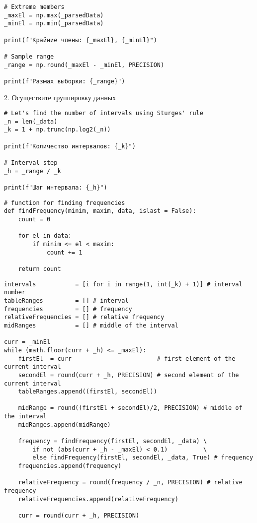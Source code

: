 \documentclass[a4paper, 14pt]{extarticle}
\begin{document}
\begin{lstlisting}
# Extreme members
_maxEl = np.max(_parsedData)
_minEl = np.min(_parsedData)

print(f"Крайние члены: {_maxEl}, {_minEl}")

# Sample range
_range = np.round(_maxEl - _minEl, PRECISION)

print(f"Размах выборки: {_range}")
\end{lstlisting}

\begin{center}
    2. Осуществите группировку данных
\end{center}

\begin{lstlisting}
# Let's find the number of intervals using Sturges' rule
_n = len(_data)
_k = 1 + np.trunc(np.log2(_n))

print(f"Количество интервалов: {_k}")

# Interval step
_h = _range / _k

print(f"Шаг интервала: {_h}")
\end{lstlisting}

\begin{lstlisting}
# function for finding frequencies
def findFrequency(minim, maxim, data, islast = False):
    count = 0

    for el in data:
        if minim <= el < maxim:
            count += 1

    return count
\end{lstlisting}
    
\begin{lstlisting}
intervals           = [i for i in range(1, int(_k) + 1)] # interval number
tableRanges         = [] # interval
frequencies         = [] # frequency
relativeFrequencies = [] # relative frequency
midRanges           = [] # middle of the interval

curr = _minEl
while (math.floor(curr + _h) <= _maxEl):
    firstEl  = curr                        # first element of the current interval 
    secondEl = round(curr + _h, PRECISION) # second element of the current interval
    tableRanges.append((firstEl, secondEl))

    midRange = round((firstEl + secondEl)/2, PRECISION) # middle of the interval
    midRanges.append(midRange)

    frequency = findFrequency(firstEl, secondEl, _data) \
        if not (abs(curr + _h - _maxEl) < 0.1)          \
        else findFrequency(firstEl, secondEl, _data, True) # frequency
    frequencies.append(frequency)                          
    
    relativeFrequency = round(frequency / _n, PRECISION) # relative frequency
    relativeFrequencies.append(relativeFrequency)

    curr = round(curr + _h, PRECISION)
\end{lstlisting}
\end{document}
